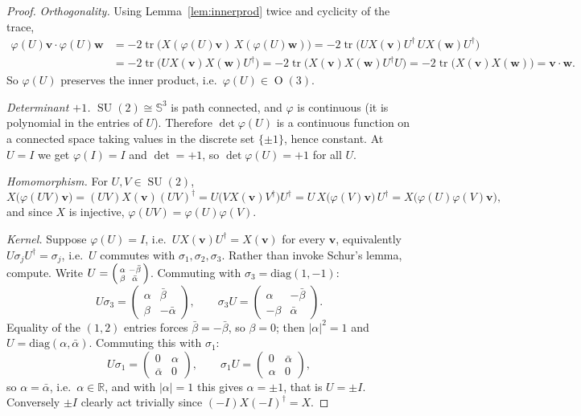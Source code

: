 \documentclass[11pt]{article}
\DeclareMathOperator{\tr}{tr}
\DeclareMathOperator{\SU}{SU}
\DeclareMathOperator{\Or}{O}
\newcommand{\R}{\mathbb{R}}
\newcommand{\Sph}{\mathbb{S}}
\newcommand{\vv}[1]{\bm{#1}}
\theoremstyle{plain}
\theoremstyle{definition}
\begin{document}
\begin{proof}
\emph{Orthogonality.} Using Lemma~\ref{lem:innerprod} twice and cyclicity of the trace,
\begin{align*}
\varphi(U)\vv v\cdot\varphi(U)\vv w
&=-2\tr\Big(X(\varphi(U)\vv v)\,X(\varphi(U)\vv w)\Big)
=-2\tr\Big(UX(\vv v)U^{\dagger}\,UX(\vv w)U^{\dagger}\Big)\\
&=-2\tr\Big(UX(\vv v)X(\vv w)U^{\dagger}\Big)
=-2\tr\Big(X(\vv v)X(\vv w)U^{\dagger}U\Big)
=-2\tr\big(X(\vv v)X(\vv w)\big)=\vv v\cdot\vv w .
\end{align*}
So $\varphi(U)$ preserves the inner product, i.e.\ $\varphi(U)\in\Or(3)$.

\emph{Determinant $+1$.} $\SU(2)\cong\Sph^3$ is path connected, and $\varphi$ is continuous
(it is polynomial in the entries of $U$). Therefore $\det\varphi(U)$ is a continuous function on a
connected space taking values in the discrete set $\{\pm1\}$, hence constant. At $U=I$ we get
$\varphi(I)=I$ and $\det=+1$, so $\det\varphi(U)=+1$ for all $U$.

\emph{Homomorphism.} For $U,V\in\SU(2)$,
\[
X\big(\varphi(UV)\vv v\big)=(UV)X(\vv v)(UV)^{\dagger}=U\big(VX(\vv v)V^{\dagger}\big)U^{\dagger}
=U\,X\big(\varphi(V)\vv v\big)\,U^{\dagger}=X\big(\varphi(U)\varphi(V)\vv v\big),
\]
and since $X$ is injective, $\varphi(UV)=\varphi(U)\varphi(V)$.

\emph{Kernel.} Suppose $\varphi(U)=I$, i.e.\ $UX(\vv v)U^{\dagger}=X(\vv v)$ for every $\vv v$,
equivalently $U\sigma_jU^{\dagger}=\sigma_j$, i.e.\ $U$ commutes with $\sigma_1,\sigma_2,\sigma_3$.
Rather than invoke Schur's lemma, compute. Write
$U=\begin{psmallmatrix}\alpha&-\bar\beta\\\beta&\bar\alpha\end{psmallmatrix}$.
Commuting with $\sigma_3=\mathrm{diag}(1,-1)$:
\[
U\sigma_3=\begin{pmatrix}\alpha&\bar\beta\\ \beta&-\bar\alpha\end{pmatrix},\qquad
\sigma_3U=\begin{pmatrix}\alpha&-\bar\beta\\ -\beta&\bar\alpha\end{pmatrix}.
\]
Equality of the $(1,2)$ entries forces $\bar\beta=-\bar\beta$, so $\beta=0$; then
$|\alpha|^2=1$ and $U=\mathrm{diag}(\alpha,\bar\alpha)$. Commuting this with $\sigma_1$:
\[
U\sigma_1=\begin{pmatrix}0&\alpha\\ \bar\alpha&0\end{pmatrix},\qquad
\sigma_1U=\begin{pmatrix}0&\bar\alpha\\ \alpha&0\end{pmatrix},
\]
so $\alpha=\bar\alpha$, i.e.\ $\alpha\in\R$, and with $|\alpha|=1$ this gives $\alpha=\pm1$, that
is $U=\pm I$. Conversely $\pm I$ clearly act trivially since $(-I)X(-I)^{\dagger}=X$.


\end{proof}
\end{document}
